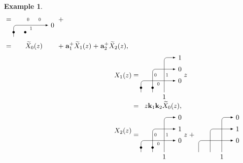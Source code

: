 \documentclass[11pt]{article}
\theoremstyle{definition}
\newtheorem{exam}[theo]{Example}
\numberwithin{equation}{section}
\newcommand{\aaa}{\mathbf{a}}
\newcommand{\kk}{\mathbf{k}}
\begin{document}
\begin{exam}
\begin{align*}
\begin{array}{@{\;=}c@{\;+\;}c@{\;+\;}c}
\begin{tikzpicture}[scale=.6,>=latex,rounded corners,baseline=-1cm,rotate=-90]
\draw[->] (3,-2) node[anchor=north] {} -- (2,-2) -- (2,1) node[anchor=west] {$0$};
\draw (1.5,0) node[anchor=west,scale=.7] {$0$};
\draw (1.5,-1) node[anchor=west,scale=.7] {$0$};
\draw (2,-.5) node[anchor=north,scale=.7] {$1$};
\fill[black] (2.6,-2) circle (.1);
\fill[black] (2.6,-1) circle (.1);
\end{tikzpicture}
\\
\widetilde{X}_0(z) & \aaa_1^+ \widetilde{X}_1(z) & \aaa_2^+ \widetilde{X}_2(z),
\end{array}
%
\allowdisplaybreaks \\
%
\raisebox{9pt}{$X_1(z)$} & \begin{array}{@{\;=}c}  \begin{tikzpicture}[scale=.6,>=latex,rounded corners,baseline=-1cm,rotate=-90]
\draw[->] (3,0) node[anchor=north] {$1$} -- (0,0) -- (0,1) node[anchor=west] {$1$};
\draw[->] (3,-1) node[anchor=north] {} -- (1,-1) -- (1,1) node[anchor=west] {$0$};
\draw[->] (3,-2) node[anchor=north] {} -- (2,-2) -- (2,1) node[anchor=west] {$0$};
\draw (1.5,0) node[anchor=west,scale=.7] {$1$};
\draw (1.5,-1) node[anchor=west,scale=.7] {$0$};
\draw (2,-.5) node[anchor=north,scale=.7] {$0$};
\fill[black] (2.6,-2) circle (.1);
\fill[black] (2.6,-1) circle (.1);
\end{tikzpicture}
z
\\
z \kk_1 \kk_2 \widetilde{X}_0(z),
\end{array}
%
\allowdisplaybreaks \\
%
\raisebox{9pt}{$X_2(z)$} & \begin{array}{@{\;=}c@{\;+\;}c} \begin{tikzpicture}[scale=.6,>=latex,rounded corners,baseline=-1cm,rotate=-90]
\draw[->] (3,0) node[anchor=north] {$1$} -- (0,0) -- (0,1) node[anchor=west] {$0$};
\draw[->] (3,-1) node[anchor=north] {} -- (1,-1) -- (1,1) node[anchor=west] {$1$};
\draw[->] (3,-2) node[anchor=north] {} -- (2,-2) -- (2,1) node[anchor=west] {$0$};
\draw (1.5,0) node[anchor=west,scale=.7] {$1$};
\draw (1.5,-1) node[anchor=west,scale=.7] {$0$};
\draw (2,-.5) node[anchor=north,scale=.7] {$0$};
\fill[black] (2.6,-2) circle (.1);
\fill[black] (2.6,-1) circle (.1);
\end{tikzpicture}
z
&
\begin{tikzpicture}[scale=.6,>=latex,rounded corners,baseline=-1cm,rotate=-90]
\draw[->] (3,0) node[anchor=north] {$1$} -- (0,0) -- (0,1) node[anchor=west] {$0$};
\draw[->] (3,-1) node[anchor=north] {} -- (1,-1) -- (1,1) node[anchor=west] {$1$};
\draw[->] (3,-2) node[anchor=north] {} -- (2,-2) -- (2,1) node[anchor=west] {$0$};

\end{tikzpicture}
\end{array}
\end{align*}
\end{exam}
\end{document}
